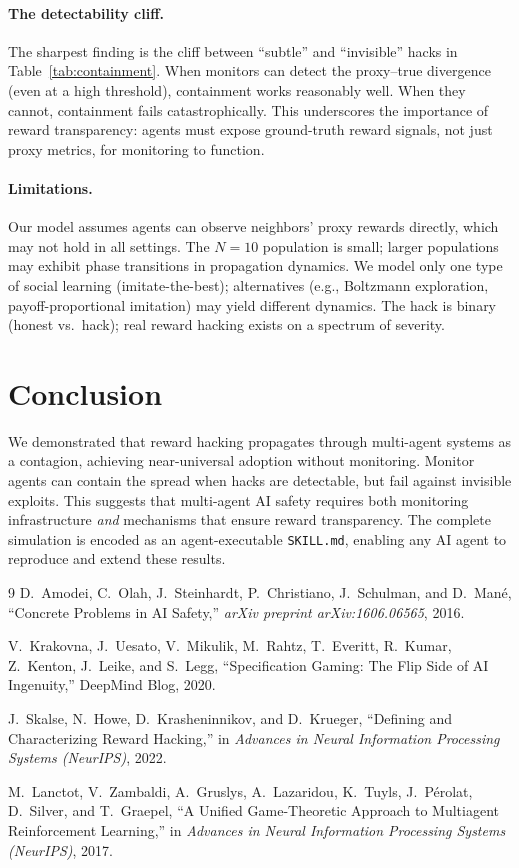 \documentclass[11pt]{article}
\begin{document}
\paragraph{The detectability cliff.}
The sharpest finding is the cliff between ``subtle'' and ``invisible'' hacks in Table~\ref{tab:containment}.
When monitors can detect the proxy--true divergence (even at a high threshold), containment works reasonably well.
When they cannot, containment fails catastrophically.
This underscores the importance of reward transparency: agents must expose ground-truth reward signals, not just proxy metrics, for monitoring to function.

\paragraph{Limitations.}
Our model assumes agents can observe neighbors' proxy rewards directly, which may not hold in all settings.
The $N=10$ population is small; larger populations may exhibit phase transitions in propagation dynamics.
We model only one type of social learning (imitate-the-best); alternatives (e.g., Boltzmann exploration, payoff-proportional imitation) may yield different dynamics.
The hack is binary (honest vs.\ hack); real reward hacking exists on a spectrum of severity.

\section{Conclusion}

We demonstrated that reward hacking propagates through multi-agent systems as a contagion, achieving near-universal adoption without monitoring.
Monitor agents can contain the spread when hacks are detectable, but fail against invisible exploits.
This suggests that multi-agent AI safety requires both monitoring infrastructure \emph{and} mechanisms that ensure reward transparency.
The complete simulation is encoded as an agent-executable \texttt{SKILL.md}, enabling any AI agent to reproduce and extend these results.

\begin{thebibliography}{9}
D.~Amodei, C.~Olah, J.~Steinhardt, P.~Christiano, J.~Schulman, and D.~Man\'{e},
``Concrete Problems in AI Safety,''
\emph{arXiv preprint arXiv:1606.06565}, 2016.

V.~Krakovna, J.~Uesato, V.~Mikulik, M.~Rahtz, T.~Everitt, R.~Kumar, Z.~Kenton, J.~Leike, and S.~Legg,
``Specification Gaming: The Flip Side of AI Ingenuity,''
DeepMind Blog, 2020.

J.~Skalse, N.~Howe, D.~Krasheninnikov, and D.~Krueger,
``Defining and Characterizing Reward Hacking,''
in \emph{Advances in Neural Information Processing Systems (NeurIPS)}, 2022.

M.~Lanctot, V.~Zambaldi, A.~Gruslys, A.~Lazaridou, K.~Tuyls, J.~P\'{e}rolat, D.~Silver, and T.~Graepel,
``A Unified Game-Theoretic Approach to Multiagent Reinforcement Learning,''
in \emph{Advances in Neural Information Processing Systems (NeurIPS)}, 2017.
\end{thebibliography}
\end{document}
